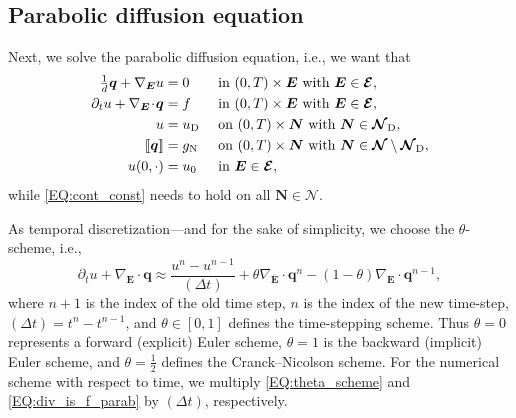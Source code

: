 \documentclass[a4paper, english, 12pt, reqno, draft]{amsart}
\theoremstyle{definition}
\theoremstyle{remark}
\numberwithin{equation}{section}
\newcommand{\SetEdge}{\ensuremath{\boldsymbol{\mathcal E}}}
\newcommand{\SetNode}{\ensuremath{\boldsymbol{\mathcal N}}}
\newcommand{\SetNodeDir}{\ensuremath{\SetNode_\textup D}}
\newcommand{\Edge}{{\ensuremath{\boldsymbol E}}}
\newcommand{\Node}{{\ensuremath{\boldsymbol N}}}
\newcommand{\Nabla}{\ensuremath{\nabla_\Edge}}
\newcommand{\Div}{\ensuremath{\Nabla\!\cdot\!}}
\newcommand{\jump}[1]{{[\![ #1 ]\!]}}
\renewcommand{\vec}[1]{\ensuremath{\boldsymbol{#1}}}
\newcommand{\deltat}{\ensuremath{(\Delta t)}}
\begin{document}
\subsection{Parabolic diffusion equation}
% 
Next, we solve the parabolic diffusion equation, i.e., we want that
% 
\begin{subequations}\label{EQ:diffusion_parab}
\begin{align}
 \tfrac{1}{d} \vec q + \Nabla u & = 0 && \text{ in } (0,T) \times \Edge \text{ with } \Edge \in \SetEdge,\label{EQ:primal_dual_parab}\\
 \partial_t u + \Div \vec q & = f && \text{ in } (0,T) \times \Edge \text{ with } \Edge \in \SetEdge,\label{EQ:div_is_f_parab}\\
 u & = u_\textup D && \text{ on } (0,T) \times \Node \text{ with } \Node \in \SetNodeDir,\label{EQ:dir_cond_parab}\\
 \jump{\vec q} & = g_\textup N && \text{ on } (0,T) \times \Node \text{ with } \Node \in \SetNode \setminus \SetNodeDir,\label{EQ:neu_cond_parab}\\
 u(0,\cdot) & = u_0 && \text{ in } \Edge \in \SetEdge,\label{EQ:initial_parab}
\end{align}
\end{subequations}
% 
while \eqref{EQ:cont_const} needs to hold on all $\Node \in \SetNode$.

As temporal discretization---and for the sake of simplicity, we choose the $\theta$-scheme, i.e.,
% 
\begin{equation}\label{EQ:theta_scheme}
 \partial_t u + \Div \vec q \approx \frac{ u^n - u^{n-1} }{\deltat} + \theta \Div \vec q^n - (1 - \theta) \Div \vec q^{n-1},
\end{equation}
%
where $n+1$ is the index of the old time step, $n$ is the index of the new time-step, $\deltat = t^n - t^{n-1}$, and $\theta \in [0,1]$ defines the time-stepping scheme. Thus $\theta = 0$ represents a forward (explicit) Euler scheme, $\theta = 1$ is the backward (implicit) Euler scheme, and $\theta = \tfrac{1}{2}$ defines the Cranck--Nicolson scheme. For the numerical scheme with respect to time, we multiply \eqref{EQ:theta_scheme} and \eqref{EQ:div_is_f_parab} by $\deltat$, respectively.
\end{document}
